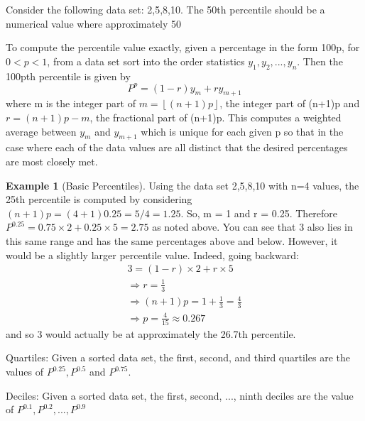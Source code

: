 \documentclass[10pt,]{book}
\theoremstyle{plain}
\theoremstyle{definition}
\theoremstyle{definition}
\newtheorem{example}[theorem]{Example}
\numberwithin{equation}{section}
\newcommand{\lt}{ < }
\begin{document}
	Consider the following data set: {2,5,8,10}. The 50th percentile should be a numerical value where approximately 50%
\par
To compute the percentile value exactly, given a percentage in the form 100p, for \(0 \lt p \lt 1\), from a data set sort into the order statistics \(y_1, y_2, ..., y_n\). Then the 100pth percentile is given by \begin{equation*}P^{p} = (1-r)y_m + ry_{m+1}\end{equation*}
	where m is the integer part of \(m = \left\lfloor (n+1)p \right\rfloor
	\), the integer part of (n+1)p and \(r = (n+1)p - m\), the fractional part of (n+1)p.  This computes a weighted average between \(y_m\) and \(y_{m+1}\) which is unique for each given p so that in the case where each of the data values are all distinct that the desired percentages are most closely met.%
\begin{example}[Basic Percentiles]\label{example-5}
Using the data set {2,5,8,10} with n=4 values, the 25th percentile is computed by considering 
		\((n+1)p = (4+1)0.25 = 5/4 = 1.25\).  
		So, m = 1 and r = 0.25. Therefore 
		\(P^{0.25} = 0.75 \times 2 + 0.25 \times 5 = 2.75\) 
		as noted above. You can see that 3 also lies in this same range and has the same percentages above and below. However, it would be a slightly larger percentile value. Indeed, going backward:
		\begin{gather*}
3 = (1-r) \times 2 + r \times 5\\
\Rightarrow r = \frac{1}{3}\\
\Rightarrow (n+1)p = 1 + \frac{1}{3} = \frac{4}{3}\\
\Rightarrow p = \frac{4}{15} \approx 0.267
\end{gather*}
		and so 3 would actually be at approximately the 26.7th percentile.
\end{example}
\par
Quartiles: Given a sorted data set, the first, second, and third quartiles are the values of 
	\(P^{0.25}, P^{0.5}\) and \(P^{0.75}\).
\par

	Deciles: Given a sorted data set, the first, second, ..., ninth deciles are the value of 
	\(P^{0.1}, P^{0.2}, ... , P^{0.9}\)
\typeout{************************************************}
\typeout{************************************************}
\end{document}
